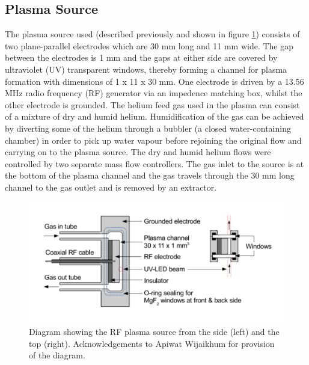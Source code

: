 \documentclass[11pt, oneside]{article}   	%
\begin{document}
\subsection{Plasma Source}
The plasma source used (described previously \cite{Niemi2013absolute} and shown in figure \ref{fig:PlasmaSource}) consists of two plane-parallel electrodes which are 30 mm long and 11 mm wide. 
The gap between the electrodes is 1 mm and the gaps at either side are covered by ultraviolet (UV) transparent windows, thereby forming a channel for plasma formation with dimensions of 1 x 11 x 30 mm.
One electrode is driven by a 13.56 MHz radio frequency (RF) generator via an impedence matching box, whilst the other electrode is grounded. 
The helium feed gas used in the plasma can consist of a mixture of dry and humid helium. Humidification of the gas can be achieved by diverting some of the helium through a bubbler (a closed water-containing chamber) in order to pick up water vapour before rejoining the original flow and carrying on to the plasma source.
The dry and humid helium flows were controlled by two separate mass flow controllers.
The gas inlet to the source is at the bottom of the plasma channel and the gas travels through the 30 mm long channel to the gas outlet and is removed by an extractor.

\begin{figure}
	\includegraphics[width=\textwidth]{Figures/PlasmafromApiwat}
	\caption{Diagram showing the RF plasma source from the side (left) and the top (right). Acknowledgements to Apiwat Wijaikhum for provision of the diagram.}
	\label{fig:PlasmaSource}
\end{figure}





\end{document}
